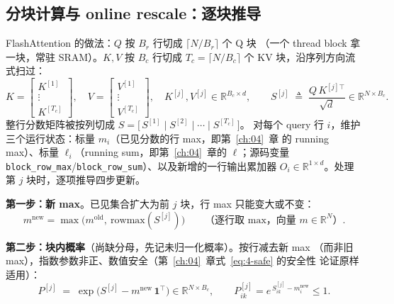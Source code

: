 \subsection{分块计算与 online rescale：逐块推导}

FlashAttention 的做法：$Q$ 按 $B_r$ 行切成 $\lceil N/B_r \rceil$ 个 Q 块
（一个 thread block 拿一块，常驻 SRAM）。$K,V$ 按 $B_c$ 行切成 $T_c = \lceil N/B_c
\rceil$ 个 KV 块，沿序列方向流式扫过：
\begin{equation}
  K = \begin{bmatrix} K^{[1]} \\ \vdots \\ K^{[T_c]} \end{bmatrix},\quad
  V = \begin{bmatrix} V^{[1]} \\ \vdots \\ V^{[T_c]} \end{bmatrix},\quad
  K^{[j]}, V^{[j]} \in \mathbb{R}^{B_c \times d},
  \qquad
  S^{[j]} \;\triangleq\; \frac{Q\,K^{[j]\top}}{\sqrt{d}} \in \mathbb{R}^{N \times B_c} .
  \label{eq:15-blocks}
\end{equation}
整行分数矩阵被按列切成 $S = \bigl[\,S^{[1]} \mid S^{[2]} \mid \cdots \mid S^{[T_c]}\,\bigr]$。
对每个 query 行 $i$，维护三个运行状态：标量 $m_i$（已见分数的行 max，即第~\ref{ch:04}~章
的 running max）、标量 $\ell_i$（running sum，即第~\ref{ch:04}~章的 $\ell$；源码变量
\texttt{block\_\allowbreak{}row\_\allowbreak{}max}/\texttt{block\_\allowbreak{}row\_\allowbreak{}sum}）、以及新增的一行输出累加器
$O_i \in \mathbb{R}^{1 \times d}$。处理第 $j$ 块时，逐项推导四步更新。

\textbf{第一步：新 max}。已见集合扩大为前 $j$ 块，行 max 只能变大或不变：
\begin{equation}
  m^{\mathrm{new}} = \max\bigl(m^{\mathrm{old}},\ \mathrm{rowmax}(S^{[j]})\bigr)
  \qquad\text{（逐行取 max，向量 } m \in \mathbb{R}^{N}\text{）} .
  \label{eq:15-upd-m}
\end{equation}

\textbf{第二步：块内概率}（尚缺分母，先记未归一化概率）。按行减去新 max
（而非旧 max），指数参数非正、数值安全（第~\ref{ch:04}~章式~\ref{eq:4-safe} 的安全性
论证原样适用）：
\begin{equation}
  P^{[j]} \;=\; \exp\bigl(S^{[j]} - m^{\mathrm{new}}\,\mathbf{1}^{\top}\bigr)
  \in \mathbb{R}^{N \times B_c},
  \qquad P^{[j]}_{ik} = e^{\,S_{ik}^{[j]} - m^{\mathrm{new}}_i} \le 1 .
  \label{eq:15-upd-p}
\end{equation}

